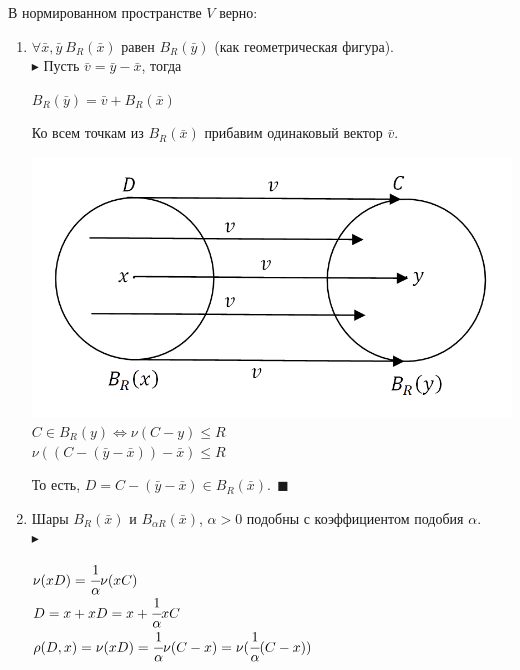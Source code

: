 \documentclass[12pt]{article}
\theoremstyle{definition}
\numberwithin{equation}{section}
\begin{document}
	В нормированном пространстве $V$ верно:\begin{enumerate}
		\item $\forall \bar x, \bar y ~B_R(\bar x)$ равен $B_R(\bar y)$ (как геометрическая фигура).\\ 
		$\blacktriangleright$ Пусть $\bar v = \bar y - \bar x$, тогда \begin{center} $B_R(\bar y) = \bar v + B_R(\bar x)$\end{center}
		Ко всем точкам из $B_R(\bar x)$ прибавим одинаковый вектор $\bar v$.\begin{center}
			\includegraphics[scale=0.5]{l4_9.png}\\
			$C \in B_R(y) \Leftrightarrow \nu(C-y) \leqslant R$\\
			$\nu((C-(\bar y - \bar x))-\bar x) \leqslant R$\end{center}
		То есть, $D = C-(\bar y-\bar x) \in B_R(\bar x). ~~\blacksquare$
		\item Шары $B_R(\bar x)$ и $ B_{\alpha R}(\bar x)$, $\alpha > 0$ подобны с коэффициентом подобия $\alpha$.\\ 
		$\blacktriangleright$ \begin{center}$\nu(x D) = \cfrac{1}{\alpha}\nu(x C)$\\
			$D = x+xD = x+\cfrac{1}{\alpha}xC$\\
			$\rho(D, x) = \nu(x D) = \cfrac{1}{\alpha}\nu(C-x) = \nu(\cfrac{1}{\alpha}(C-x))$\\

\end{center}
\end{enumerate}
\end{document}

